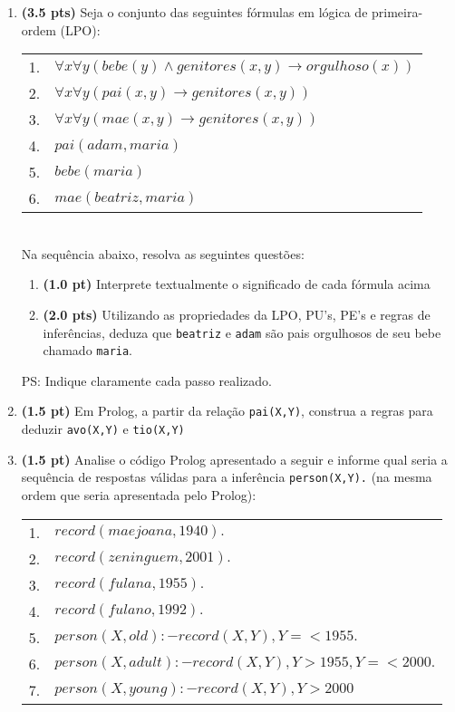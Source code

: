 \documentclass[a4paper,12pt]{article}
\begin{document}
\begin{enumerate}
\item {\bf (3.5 pts)} Seja o conjunto das seguintes fórmulas em lógica de primeira-ordem (LPO):\\
\begin{center}
\begin{tabular}{ll}
 \hline \hline
    1. &  $\forall x\forall y (bebe(y) \wedge genitores(x,y) \rightarrow orgulhoso(x)) $ \\
    2. &  $\forall x\forall y ( pai(x,y) \rightarrow genitores(x,y) ) $ \\
    3. &  $\forall x\forall y ( mae(x,y) \rightarrow genitores(x,y) ) $ \\
    4. &  $ pai(adam, maria) $ \\
    5. &  $ bebe(maria) $ \\
    6. &  $ mae(beatriz, maria) $ \\ \hline \hline
 \end{tabular}
\end{center}
 \\
Na sequência abaixo, resolva as seguintes questões:
\begin{enumerate}
\setlength{\itemsep}{-3pt}
\item {\bf (1.0 pt)} Interprete textualmente o significado de cada fórmula acima
\item {\bf (2.0 pts)} Utilizando as propriedades da LPO, PU's, PE's e regras de inferências, deduza que \texttt{beatriz} e \texttt{adam}
são pais orgulhosos de seu bebe chamado \texttt{maria}.
\end{enumerate}
PS: Indique claramente cada passo realizado.

\item {\bf (1.5 pt)} Em Prolog, a partir da relação \texttt{pai(X,Y)}, construa a regras para deduzir \texttt{avo(X,Y)} e \texttt{tio(X,Y)}

\item {\bf (1.5 pt)} Analise o código Prolog apresentado a seguir e informe qual seria a sequência de respostas válidas para a inferência {\tt person(X,Y).} {\small (na mesma ordem que seria apresentada pelo Prolog)}:

\begin{center}
\begin{tabular}{ll}
 \hline \hline
    1. &  $record(maejoana,1940).$ \\
    2. &  $record(zeninguem, 2001).$ \\
    3. &  $record(fulana,1955).$ \\
    4. &  $record(fulano, 1992).$\\
    5. &  $person(X,old) :- record(X,Y), Y=<1955.$ \\
    6. &  $person(X,adult) :- record(X,Y), Y>1955, Y=<2000.$ \\
    7. &  $person(X,young) :- record(X,Y), Y>2000$ \\ \hline \hline
 \end{tabular}
\end{center}


\end{enumerate}
\end{document}
